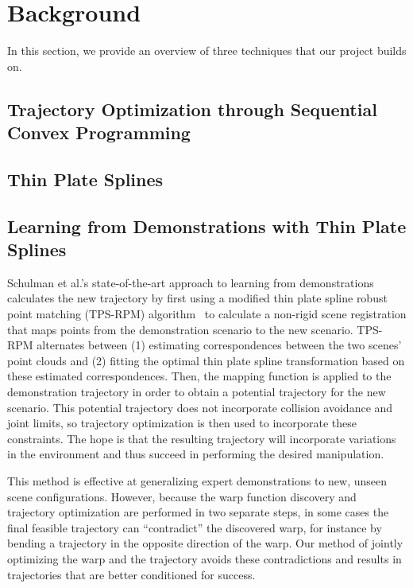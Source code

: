 \documentclass{article}
\begin{document}

\section{Background}
In this section, we provide an overview of three techniques that our project builds on.
\subsection{Trajectory Optimization through Sequential Convex Programming}

\subsection{Thin Plate Splines}
 
\subsection{Learning from Demonstrations with Thin Plate Splines}


Schulman et al.'s state-of-the-art approach to learning from demonstrations~\cite{Schulmanetal_ISRR2013} calculates the new trajectory by first using a modified thin plate spline robust point matching (TPS-RPM) algorithm~\cite{ChuiR00} to calculate a non-rigid scene registration that maps points from the demonstration scenario to the new scenario. TPS-RPM alternates between (1) estimating correspondences between the two scenes' point clouds and (2) fitting the optimal thin plate spline transformation based on these estimated correspondences. Then, the mapping function is applied to the demonstration trajectory in order to obtain a potential trajectory for the new scenario. This potential trajectory does not incorporate collision avoidance and joint limits, so trajectory optimization is then used to incorporate these constraints. The hope is that the resulting trajectory will incorporate variations in the environment and thus succeed in performing the desired manipulation.

This method is effective at generalizing expert demonstrations to new, unseen scene configurations. However, because the warp function discovery and trajectory optimization are performed in two separate steps, in some cases the final feasible trajectory can ``contradict'' the discovered warp, for instance by bending a trajectory in the opposite direction of the warp. Our method of jointly optimizing the warp and the trajectory avoids these contradictions and results in trajectories that are better conditioned for success.
\end{document}
